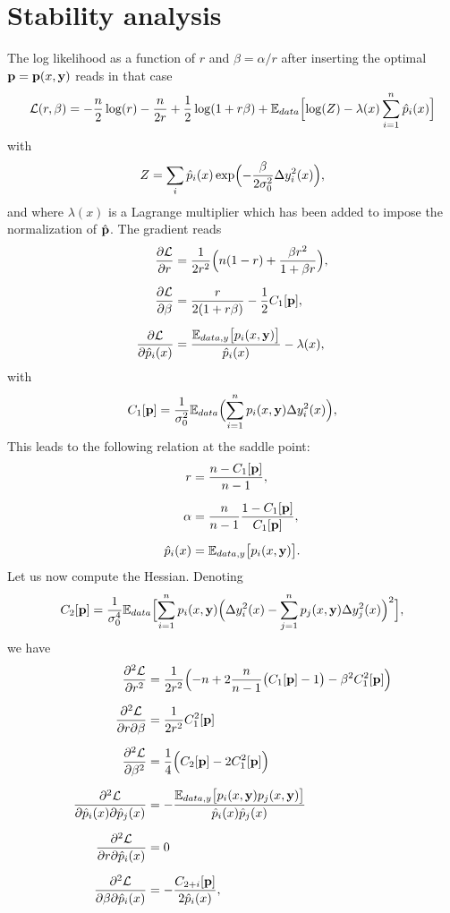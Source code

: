 \section{Stability analysis}\label{app:Hessian}
The log likelihood as a function of $r$ and $\beta=\alpha/r$ after inserting the optimal
${\bf p} = {\bf p}(x,{\bf y})$ reads in that case
\[
{\cal L}(r,\beta) = -\frac{n}{2}\log(r)-\frac{n}{2r}+\frac{1}{2}\log(1+r\beta)+{\mathbb E}_{data}\Bigl[\log(Z)-\lambda(x)\sum_{i=1}^n \hat p_i(x)\Bigr]
\]
with
\[
Z = \sum_i \hat p_i(x)\exp\Bigl(-\frac{\beta}{2\sigma_0^2}\Delta y_i^2(x)\Bigr),
\]
and where $\lambda(x)$ is a Lagrange multiplier which has been added to impose the normalization of $\hat {\bf p}$.
The gradient reads
\begin{align*}
  \frac{\partial {\cal L}}{\partial r} &= \frac{1}{2r^2}\Bigl(n(1-r)+\frac{\beta r^2}{1+\beta r}\Bigr),\\[0.2cm]
  \frac{\partial {\cal L}}{\partial \beta} &= \frac{r}{2(1+r\beta)}-\frac{1}{2}C_1[{\bf p}],\\[0.2cm]
  \frac{\partial {\cal L}}{\partial \hat p_i(x)} &= \frac{{\mathbb E}_{data,y}\bigl[ p_i(x,\bf y)\bigr]}{\hat p_i(x)}-\lambda(x),
\end{align*}
with
\[
C_1[{\bf p}] = \frac{1}{\sigma_0^2}{\mathbb E}_{data}\Bigl(\sum_{i=1}^n p_i(x,{\bf y})\Delta y_i^2(x)\Bigr),
\]
This leads to the following relation at the saddle point:
\begin{align*}
  r &= \frac{n-C_1[{\bf p}]}{n-1},\\[0.2cm]
  \alpha &= \frac{n}{n-1}\frac{1-C_1[{\bf p}]}{C_1[{\bf p}]},\\[0.2cm]
  \hat p_i(x) &= {\mathbb E}_{data,y}\bigl[ p_i(x,{\bf y})\bigr].
\end{align*}
Let us now compute the Hessian. Denoting
\[
C_2[{\bf p}] = \frac{1}{\sigma_0^4}{\mathbb E}_{data}\Bigl[\sum_{i=1}^n p_i(x,{\bf y})\Bigl(\Delta y_i^2(x)-\sum_{j=1}^np_j(x,{\bf y})\Delta y_j^2(x)\Bigr)^2\Bigr],
\]
we have
\begin{align*}
\frac{\partial^2 {\cal L}}{\partial r^2} &= \frac{1}{2r^2}\Bigl(-n +2\frac{n}{n-1}\bigl(C_1[{\bf p}]-1\bigr)-\beta^2 C_1^2[{\bf p}]\Bigr)\\[0.2cm]
\frac{\partial^2 {\cal L}}{\partial r\partial \beta} &=\frac{1}{2r^2}C_1^2[{\bf p}]\\[0.2cm]
\frac{\partial^2 {\cal L}}{\partial \beta^2} &= \frac{1}{4}\Bigl(C_2[{\bf p}]-2C_1^2[{\bf p}]\Bigr)\\[0.2cm]
\frac{\partial^2 {\cal L}}{\partial \hat p_i(x)\partial\hat p_j(x)}  &= -\frac{{\mathbb E}_{data,y}\bigl[ p_i(x,{\bf y})p_j(x,{\bf y})\bigr]}{\hat p_i(x)\hat p_j(x)}\\[0.2cm]
\frac{\partial^2 {\cal L}}{\partial r\partial\hat p_i(x)} &= 0\\[0.2cm]
\frac{\partial^2 {\cal L}}{\partial \beta\partial\hat p_i(x)} &= -\frac{C_{2+i}[{\bf p}]}{2\hat p_i(x)},
\end{align*}

